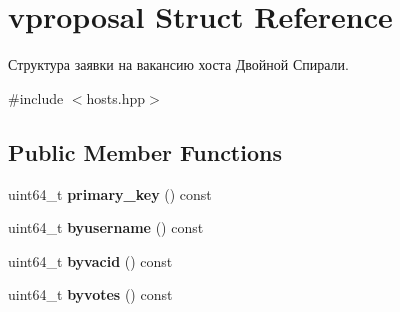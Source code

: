 \hypertarget{structvproposal}{}\section{vproposal Struct Reference}
\label{structvproposal}


Структура заявки на вакансию хоста Двойной Спирали.  




{\ttfamily \#include $<$hosts.\+hpp$>$}

\subsection*{Public Member Functions}
\begin{DoxyCompactItemize}
\item 
\mbox{\label{structvproposal_a1808a81bea55e9cb4ae86c3bbaf839c5}} 
uint64\+\_\+t {\bfseries primary\+\_\+key} () const
\item 
\mbox{\label{structvproposal_a64731d926c4cf39b9f52516588653064}} 
uint64\+\_\+t {\bfseries byusername} () const
\item 
\mbox{\label{structvproposal_a31c5443a100d694e82cfa38875cc9e21}} 
uint64\+\_\+t {\bfseries byvacid} () const
\item 
\mbox{\label{structvproposal_a1a2eb6f0681aa2369a5c944394a3369c}} 
uint64\+\_\+t {\bfseries byvotes} () const
\end{DoxyCompactItemize}
